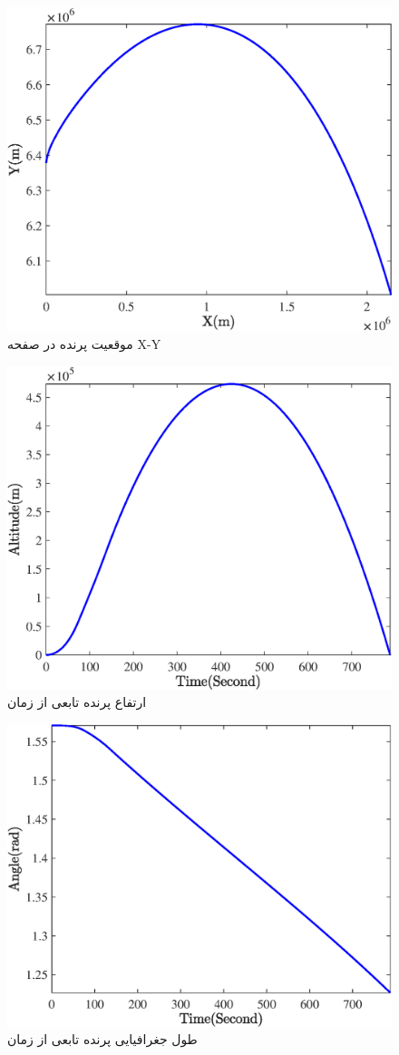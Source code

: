 \begin{figure}[H]
	\centering
	\includegraphics[width=.75\linewidth]{../Figure/Q1/d/xy}
	\caption{موقعیت پرنده در صفحه X-Y  }
\end{figure}


\begin{figure}[H]
	\centering
	\includegraphics[width=.75\linewidth]{../Figure/Q1/d/alt}
	\caption{ارتفاع پرنده تابعی از زمان}
\end{figure}


\begin{figure}[H]
	\centering
	\includegraphics[width=.75\linewidth]{../Figure/Q1/d/angle}
	\caption{طول جغرافیایی پرنده تابعی از زمان}
\end{figure}


